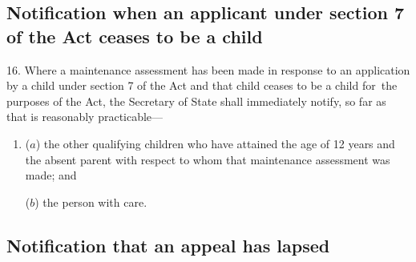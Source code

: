 \documentclass[a4paper,12pt]{article}
\begin{document}
\subsection[16. Notification when an applicant under section 7 of the Act ceases to be a child]{\sloppy Notification when an applicant under section 7 of the Act ceases to be a child}

16.  Where a maintenance assessment has been made in response to an application by a child under section 7 of the Act and that child ceases to be a child for~the purposes of the Act, 
the Secretary of State  %
shall immediately notify, so far as that is reasonably practicable—
\begin{enumerate}\item[]
($a$) the other qualifying children 
who have attained the age of 12 years %
and the absent parent with respect to whom that maintenance assessment was made; and

($b$) the person with care.
\end{enumerate}


%
%

\subsection[16A. Notification that an appeal has lapsed]{Notification that an appeal has lapsed}
\end{document}
